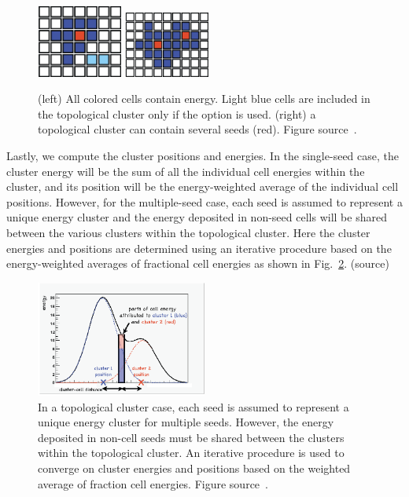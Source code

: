 \begin{figure}[t!]
\centering
\includegraphics[width=0.25\textwidth]{figures/topological_cluster_oneseed.png}
\includegraphics[width=0.25\textwidth]{figures/topological_cluster_many_Seeds.png}
\caption[Types of topological cluster]{(left) All colored cells contain energy. Light blue cells are included in the topological cluster only if the option is used. (right) a topological cluster can contain several seeds (red). Figure source~\cite{Clustering}.}
\label{fig:topo_cluster}
\end{figure}

Lastly, we compute the cluster positions and energies.
In the single-seed case, the cluster energy will be the sum of all the individual cell energies within the cluster, and its position will be the energy-weighted average of the individual cell positions.
However, for the multiple-seed case, each seed is assumed to represent a unique energy cluster and the energy deposited in non-seed cells will be shared between the various clusters within the topological cluster.
Here the cluster energies and positions are determined using an iterative procedure based on the energy-weighted averages of fractional cell energies as shown in Fig.~\ref{fig:clustering}. (source)

\begin{figure}[t!]
\centering
\includegraphics[width=0.50\textwidth]{figures/energy_sharing.png}
\caption[Energy shared between clusters]{In a topological cluster case, each seed is assumed to represent a unique energy cluster for multiple seeds. However, the energy deposited in non-cell seeds must be shared between the clusters within the topological cluster. An iterative procedure is used to converge on cluster energies and positions based on the weighted average of fraction cell energies. Figure source~\cite{Clustering}.}
\label{fig:clustering}
\end{figure}

